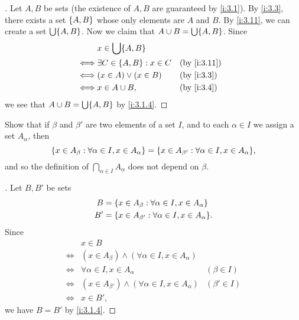 \begin{proof}[]
  Let \(A, B\) be sets (the existence of \(A, B\) are guaranteed by \cref{i:3.1}).
  By \cref{i:3.3}, there exists a set \(\left\lbrace A, B\right\rbrace\) whose only elements are \(A\) and \(B\).
  By \cref{i:3.11}, we can create a set \(\bigcup \set{A, B}\).
  Now we claim that \(A \cup B = \bigcup \set{A, B}\).
  Since
  \begin{align*}
         & x \in \bigcup \set{A, B}                            \\
    \iff & \exists C \in \set{A, B} : x \in C &  & \by{i:3.11} \\
    \iff & (x \in A) \lor (x \in B)           &  & \by{i:3.3}  \\
    \iff & x \in A \cup B,                    &  & \by{i:3.4}
  \end{align*}
  we see that \(A \cup B = \bigcup \set{A, B}\) by \cref{i:3.1.4}.
\end{proof}

\begin{ex}\label{i:ex:3.4.9}
  Show that if \(\beta\) and \(\beta'\) are two elements of a set \(I\), and to each \(\alpha \in I\) we assign a set \(A_\alpha\), then
  \[
    \set{x \in A_\beta : \forall \alpha \in I, x \in A_\alpha} = \set{x \in A_{\beta'} : \forall \alpha \in I, x \in A_\alpha},
  \]
  and so the definition of \(\bigcap_{\alpha \in I} A_\alpha\) does not depend on \(\beta\).
\end{ex}

\begin{proof}[]
  Let \(B, B'\) be sets
  \begin{align*}
    B  & = \set{x \in A_\beta : \forall \alpha \in I, x \in A_\alpha}     \\
    B' & = \set{x \in A_{\beta'} : \forall \alpha \in I, x \in A_\alpha}.
  \end{align*}
  Since
  \begin{align*}
         & x \in B                                                                          \\
    \iff & (x \in A_\beta) \land (\forall \alpha \in I, x \in A_\alpha)                     \\
    \iff & \forall \alpha \in I, x \in A_\alpha                            & (\beta \in I)  \\
    \iff & (x \in A_{\beta'}) \land (\forall \alpha \in I, x \in A_\alpha) & (\beta' \in I) \\
    \iff & x \in B',
  \end{align*}
  we have \(B = B'\) by \cref{i:3.1.4}.
\end{proof}

